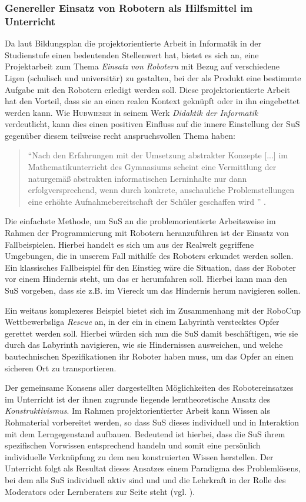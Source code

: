 \documentclass[paper=a4, DIV=calc, BCOR=12mm, twoside=on, onecolumn=on, open = right, titlepage =on, parskip =half-, headsepline = on, footsepline = off, chapterprefix = off, appendixprefix = on, fontsize = 12pt, numbers = noenddot, abstract = on]{scrbook}
\begin{document}
\vspace*{-2ex}
\subsubsection{Genereller Einsatz von Robotern als Hilfsmittel im Unterricht}
Da laut Bildungsplan die projektorientierte Arbeit in Informatik in der Studienstufe einen bedeutenden Stellenwert hat, bietet es sich an, eine Projektarbeit zum Thema \emph{Einsatz von Robotern} mit Bezug auf verschiedene Ligen (schulisch und universitär) zu gestalten, bei der als Produkt eine bestimmte Aufgabe mit den Robotern erledigt werden soll.  Diese projektorientierte Arbeit hat den Vorteil, dass sie an einen realen Kontext geknüpft oder in ihn eingebettet werden kann. Wie \textsc{Hubwieser} in seinem Werk \emph{Didaktik der Informatik} verdeutlicht, kann dies einen positiven Einfluss auf die innere Einstellung der SuS gegenüber diesem teilweise recht anspruchsvollen Thema haben:
\begin{quote}
"`Nach den Erfahrungen mit der Umsetzung abstrakter Konzepte [...] im Mathematikunterricht des Gymnasiums scheint eine Vermittlung der naturgemäß abstrakten informatischen Lerninhalte nur dann erfolgversprechend, wenn durch konkrete, anschauliche Problemstellungen eine erhöhte Aufnahmebereitschaft der Schüler geschaffen wird "' \cite[S.68]{hubwieser:07}.
\end{quote}

Die einfachste Methode, um SuS an die problemorientierte Arbeitsweise im Rahmen der Programmierung mit Robotern heranzuführen ist der Einsatz von Fallbeispielen. Hierbei handelt es sich um aus der Realwelt gegriffene Umgebungen, die in unserem Fall mithilfe des Roboters erkundet werden sollen. Ein klassisches Fallbeispiel für den Einstieg wäre die Situation, dass der Roboter vor einem Hindernis steht, um das er herumfahren soll. Hierbei kann man den SuS vorgeben, dass sie z.B. im Viereck um das Hindernis herum navigieren sollen.

Ein weitaus komplexeres Beispiel bietet sich im Zusammenhang mit der RoboCup Wettbewerbsliga \emph{Rescue} an, in der ein in einem Labyrinth verstecktes Opfer gerettet werden soll. Hierbei würden sich nun die SuS damit beschäftigen, wie sie durch das Labyrinth navigieren, wie sie Hindernissen ausweichen, und welche bautechnischen Spezifikationen ihr Roboter haben muss, um das Opfer an einen sicheren Ort zu transportieren.

Der gemeinsame Konsens aller dargestellten Möglichkeiten des Robotereinsatzes im Unterricht ist der ihnen zugrunde liegende lerntheoretische Ansatz des \emph{Konstruktivismus}. Im Rahmen projektorientierter Arbeit kann Wissen als Rohmaterial vorbereitet werden, so dass SuS dieses individuell und in Interaktion mit dem Lerngegenstand aufbauen. Bedeutend ist hierbei, dass die SuS ihrem spezifischen Vorwissen entsprechend handeln und somit eine persönlich individuelle Verknüpfung zu dem neu konstruierten Wissen herstellen.
Der Unterricht folgt als Resultat dieses Ansatzes einem Paradigma des Problemlösens, bei dem alls SuS individuell aktiv sind und und die Lehrkraft in der Rolle des Moderators oder Lernberaters zur Seite steht (vgl. \cite[S.219f.]{schwarzer:07}).
\end{document}
